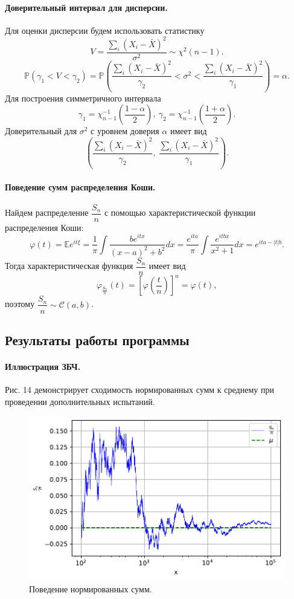 \documentclass[16pt]{article}
\begin{document}
\paragraph{Доверительный интервал для дисперсии.}
Для оценки дисперсии будем использовать статистику
$$V = \frac{\sum_i(X_i - \bar X)^2}{\sigma^2} \sim \chi^2(n - 1).$$
$$\mathbb{P}(\gamma_1 < V < \gamma_2) = \mathbb{P}\left(\frac{\sum_i(X_i - \bar X)^2}{\gamma_2} < \sigma^2 < \frac{\sum_i(X_i - \bar X)^2}{\gamma_1}\right) = \alpha.$$
Для построения симметричного интервала
$$\gamma_1 = \chi_{n-1}^{-1}\left(\frac{1-\alpha}{2}\right), \ \gamma_2 = \chi_{n-1}^{-1}\left(\frac{1+\alpha}{2}\right).$$
Доверительный для $\sigma^2$ с уровнем доверия $\alpha$ имеет вид
$$\left(\frac{\sum_i(X_i - \bar X)^2}{\gamma_2}, \ \frac{\sum_i(X_i - \bar X)^2}{\gamma_1}\right).$$

\paragraph{Поведение сумм распределения Коши.}
Найдем распределение $\dfrac{S_n}{n}$ с помощью характеристической функции распределения Коши:
$$\varphi(t) = \mathbb{E}e^{it\xi} = \frac1\pi\int\frac{be^{itx}}{(x - a)^2 + b^2}dx = \frac{e^{ita}}{\pi}\int\frac{e^{itbx}}{x^2 + 1}dx = e^{ita - |t|b}.$$
Тогда характеристическая функция $\dfrac{S_n}{n}$ имеет вид
$$\varphi_{\frac{S_n}{n}}(t) = \left[\varphi\left(\frac{t}{n}\right)\right]^n = \varphi(t),$$
поэтому $\dfrac{S_n}{n} \sim \mathcal{C}(a, b)$.

\subsection{Результаты работы программы}
\paragraph{Иллюстрация ЗБЧ.} Рис. 14 демонстрирует сходимость нормированных сумм к среднему при проведении дополнительных испытаний.

\begin{figure}[h]
	\center
	\includegraphics[scale=0.7]{5_1.pdf}
	\caption{Поведение нормированных сумм.}
\end{figure}
\end{document}
